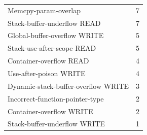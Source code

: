 \begin{table}[ht]
\begin{tabular}{@{}lr@{}}
Memcpy-param-overlap                 & 7   \\
Stack-buffer-underflow READ          & 7   \\
Global-buffer-overflow WRITE         & 5   \\
Stack-use-after-scope READ           & 5   \\
Container-overflow READ              & 4   \\
Use-after-poison WRITE               & 4   \\
Dynamic-stack-buffer-overflow WRITE  & 3   \\
Incorrect-function-pointer-type      & 2   \\
Container-overflow WRITE             & 2   \\
Stack-buffer-underflow WRITE         & 1   \\
\bottomrule
\end{tabular}
\end{table}
